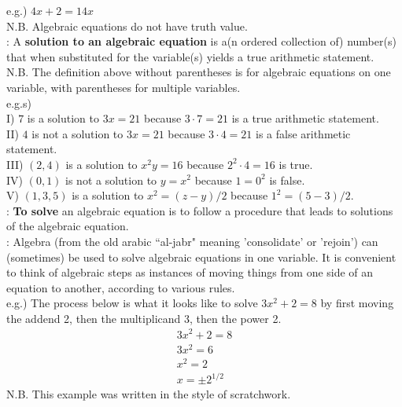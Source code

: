 \documentclass[12pt]{article}
\def\bea{\begin{align}}
\def\eea{\end{align}}
\def\nn{\nonumber}
\def\ni{\noindent}
\begin{document}
\ni e.g.) $4x+2=14x$\\

\ni N.B. Algebraic equations do not have truth value.\\

 \ni {\bfseries Definition}:
 A {\bfseries solution to an algebraic equation} is a(n ordered collection of) number(s) that when substituted for the variable(s) yields a true arithmetic statement.\\
 
 \ni N.B. The definition above without parentheses is for algebraic equations on one variable, with parentheses for multiple variables. \\
 
\ni  e.g.s) \\
I) $7$ is a solution to $3x=21$ because $3\cdot7=21$ is a true arithmetic statement.\\
 II) $4$ is not a solution to $3x=21$ because $3\cdot4=21$ is a false arithmetic statement.\\
 III) $(2,4)$ is a solution to $x^2y=16$ because $2^2\cdot4=16$ is true.\\
 IV) $(0,1)$ is not a solution to $y=x^2$ because $1=0^2$ is false. \\ 
 V) $(1,3,5)$ is  a solution to $x^2=(z-y)/2$ because $1^2=(5-3)/2$. \\ 

%
 \ni {\bfseries Definition}:
{\bfseries To solve} an algebraic equation is to follow a procedure that leads to solutions of the algebraic equation.\\



\ni {\bfseries Recall}: Algebra (from the old arabic ``al-jabr" meaning 'consolidate' or 'rejoin') can (sometimes) be used to solve algebraic equations in one variable. It is convenient to think of algebraic steps as instances of moving things from one side of an equation to another, according to various rules.\\

\ni e.g.) The process below is what it looks like to solve $3x^2+2=8$ by first moving the addend 2, then the multiplicand 3, then the power 2.
\bea \nn
3x^2+2=8\\ \nn
3x^2=6\\ \nn
x^2=2 \\ \nn
x=\pm 2^{1/2}
\eea
N.B. This example was written in the style of scratchwork.\\
\end{document}
